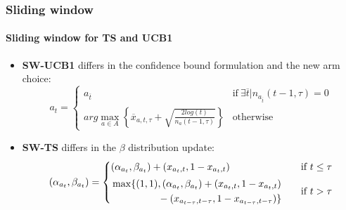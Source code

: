 \documentclass[11pt]{beamer}
\begin{document}

\begin{frame}
\frametitle{Sliding window}
\framesubtitle{Sliding window for TS and UCB1}

\begin{itemize}[leftmargin=*, label={$\circ$}]
    \item \textbf{SW-UCB1} differs in the confidence bound formulation and the new arm choice:
        \begin{displaymath}
            a_t =
            \begin{cases}
                a_{\overline{t}} & \text{if} ~ \exists \overline{t} \vert n_{a_{\overline{t}}}(t-1, \tau) = 0 \\
                arg\max\limits_{a \in A} \left\{ \overline{x}_{a, t, \tau} + \sqrt{\frac{2log(t)}{n_a(t-1, \tau)}} \right\} & \text{otherwise}
            \end{cases}
        \end{displaymath}
    \item \textbf{SW-TS} differs in the $\beta$ distribution update:
        \begin{displaymath}
            \displayindent0pt \displaywidth\textwidth
            (\alpha_{a_t}, \beta_{a_t}) =
            \begin{cases}
                (\alpha_{a_t}, \beta_{a_t}) + (x_{a_t, t}, 1-x_{a_t, t}) & \text{if} ~ t \leq \tau \\[1ex]
                \!\begin{aligned}
                    & \max \{ (1, 1)\!\begin{aligned}[t]
                        & , (\alpha_{a_t}, \beta_{a_t}) + (x_{a_t, t}, 1-x_{a_t, t}) \\
                        & - (x_{a_{t-\tau}, t-\tau}, 1-x_{a_{t-\tau}, t-\tau}) \}
                    \!\end{aligned}
                \end{aligned} & \text{if} ~ t > \tau
            \end{cases}
        \end{displaymath}
\end{itemize}

\end{frame}

\end{document}
